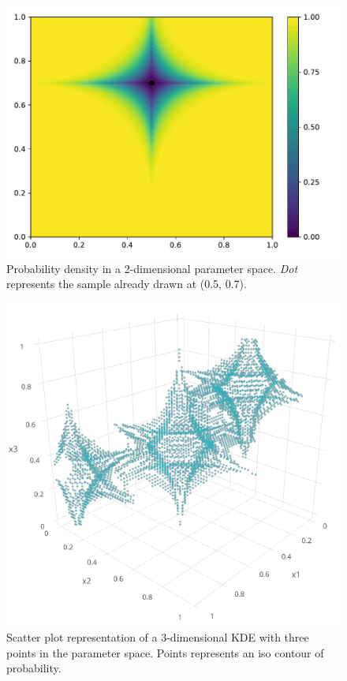 \begin{figure}[!h]               
\centering
\includegraphics[width=0.8\linewidth,height=\textheight,keepaspectratio]{fig/contributions/doe/inv_minkowsky.pdf}
\caption{Probability density in a 2-dimensional parameter space. \emph{Dot} represents the sample already drawn at (0.5, 0.7).}
 \label{fig:minkowsky}
\end{figure}

\begin{figure}[!h]
\centering
\includegraphics[width=0.8\linewidth,keepaspectratio]{fig/contributions/doe/3d_star.png}
\caption{Scatter plot representation of a 3-dimensional KDE with three points in the parameter space. Points represents an iso contour of probability.}
\label{fig:3d_kde}
\end{figure}


